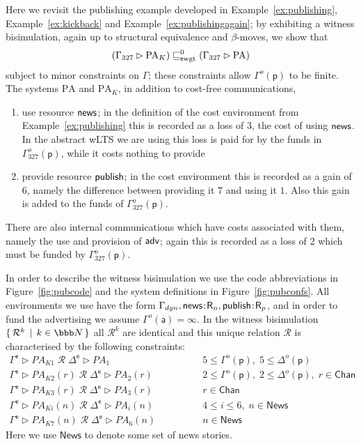 \documentclass{LMCS}
\newcommand{\pfn}[1]{\mathsf{#1}}  \newcommand{\cfn}[1]{\mathsf{#1}}  \newcommand{\ownfnt}[1]{{\mathsf{#1}}}
\newcommand{\with}{\mathbin \rhd}
\newcommand{\Chan}{\ensuremath{\pfn{Chan}}\xspace}
\newcommand{\News}{\ensuremath{\pfn{News}}\xspace}
\newcommand{\nats}{\ensuremath{\bbb N}\xspace}
\newcommand{\sobs}{{\ownfnt e}}
\newcommand{\Gammaobs}{\Gamma^{\sobs}}
\newcommand{\Deltaobs}{\Delta^{\sobs}}
\newcommand{\Eamort}[1]{\mathrel{\sqsubseteq_{\rm \sobs wgt}^{#1}}}
\newcommand{\Gammadyn}{\Gamma_{\scriptstyle dyn}}
\newcommand{\setof}[2]{\{ \, #1 \, \mid \, #2 \, \}}\newcommand{\sset}[1]{\{ {#1}  \}  }
\newcommand{\typeletter}[1]{{\mathsf{#1}}}
\newcommand{\tR}{\typeletter{R}}
\newcommand{\calR}{\mathbin{\mathcal{R}}}
\newcommand{\Cassoc}[2]{ {{#1}\kern -0.2em : \kern -0.2em {#2}}}
\begin{document}
Here we revisit the publishing example developed in Example~\ref{ex:publishing}, Example~\ref{ex:kickback} and
Example~\ref{ex:publishingagain}; by exhibiting a witness bisimulation, again up to structural equivalence and 
$\beta$-moves, we show that
\begin{align}\label{ex:pub.provedagain}
  (\Gamma_{327} \with  \text{PA}_K)  \Eamort{0} ( \Gamma_{327} \with \text{PA})
\end{align}
subject to minor constraints on $\Gamma$; these constraints allow $\Gamma^o(\ownfnt p)$ to be finite. 
The systems $\text{PA}$ and $\text{PA}_K$, in addition to cost-free communications,
\begin{enumerate}[$\bullet$]
\item use resource $\news$; in the definition of the cost environment from Example~\ref{ex:publishing} this is
recorded as a loss of 3, the cost of using $\news$. In the abstract wLTS we are using this loss is paid for by
the funds in $\Gamma_{327}^o(\ownfnt p)$, while it costs nothing to provide

\item provide resource $\publish$; in the cost environment this is recorded as a gain of $6$, namely the difference between
providing it $7$ and using it $1$. Also this gain is added to the funds of $\Gamma_{327}^o(\ownfnt p)$.
\end{enumerate}
There are also internal communications which have costs associated with them, namely the use and provision of $\adv$; again
this is recorded as a loss of 2 which must be funded by $\Gamma_{327}^o(\ownfnt p)$. 

In order to describe the witness bisimulation we use the code abbreviations in Figure~\ref{fig:pubcode} and the  
system definitions in Figure~\ref{fig:pubconfs}. All environments we use have the form 
$\Gammadyn, 
\Cassoc{\news}{\tR_n},
\Cassoc{\publish}{\tR_p}$, and in order to fund the advertising we assume $\Gamma^o(\ownfnt a) = \infty$. 
In the witness bisimulation 
$\setof{\calR^k}{k \in \nats}$ all $\calR^k$ are identical and this unique relation $\calR$ is characterised by the following
constraints:
\begin{align*}
  \Gammaobs \with PA_{K1} \;\calR\; \Deltaobs \with PA_1  &\qquad\qquad 5 \leq \Gamma^o(\ownfnt p),\; 5 \leq \Delta^o(\ownfnt p)\\
  \Gammaobs \with PA_{K2}(r) \;\calR\; \Deltaobs \with PA_2 (r)  &\qquad\qquad 2\leq \Gamma^o(\ownfnt p),\; 
                              2 \leq \Delta^o(\ownfnt p),\; r \in \Chan\\
  \Gammaobs \with PA_{K3}(r) \;\calR\; \Deltaobs \with PA_3(r)   &\qquad\qquad  r \in \Chan\\
  \Gammaobs \with PA_{Ki}(n) \;\calR\; \Deltaobs \with PA_i(n)   &\qquad\qquad 4 \leq i \leq 6,\; n \in \News\\
  \Gammaobs \with PA_{K7}(n) \;\calR\; \Deltaobs \with PA_6(n)  &\qquad\qquad  n \in \News
\end{align*}
Here we use $\News$ to denote some set of news stories.
\end{document}
